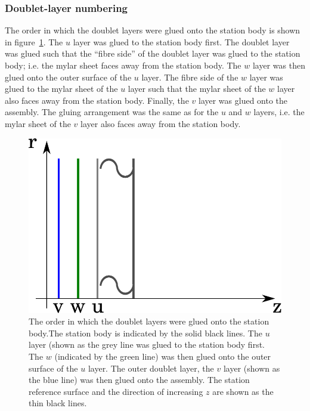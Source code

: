 \subsubsection{Doublet-layer numbering}
\label{SubSubSect:DblNmbrng}

The order in which the doublet layers were glued onto the station body is shown in figure~\ref{Fig:DblLyrOrder}. The $u$ layer was glued to the station body first. The doublet layer was glued such that the ``fibre side'' of the doublet layer was glued to the station body; i.e. the mylar sheet faces away from the station body. The $w$ layer was then glued onto the outer surface of the $u$ layer. The fibre side of the $w$ layer was glued to the mylar sheet of the $u$ layer such that the mylar sheet of the $w$ layer also faces away from the station body. Finally, the $v$ layer was glued onto the assembly. The gluing arrangement was the same as for the $u$ and $w$ layers, i.e. the mylar sheet of the $v$ layer also faces away from the station body. 


\begin{figure}
  \begin{center}
    \includegraphics[width=0.65\linewidth]{detectors/tracker/02-Definitions/Figures/doublet-layer-order.pdf}
  \end{center}
  \caption{ The order in which the doublet layers were glued onto the station body.The station body is indicated by the solid black lines. The $u$ layer (shown as the grey line was glued to the station body first. The $w$ (indicated by the green line) was then glued onto the outer surface of the $u$ layer.  The outer doublet layer, the $v$ layer (shown as the blue line) was then glued onto the assembly. The station reference surface and the direction of increasing $z$  are shown as the thin black lines.}
  \label{Fig:DblLyrOrder}
\end{figure}

